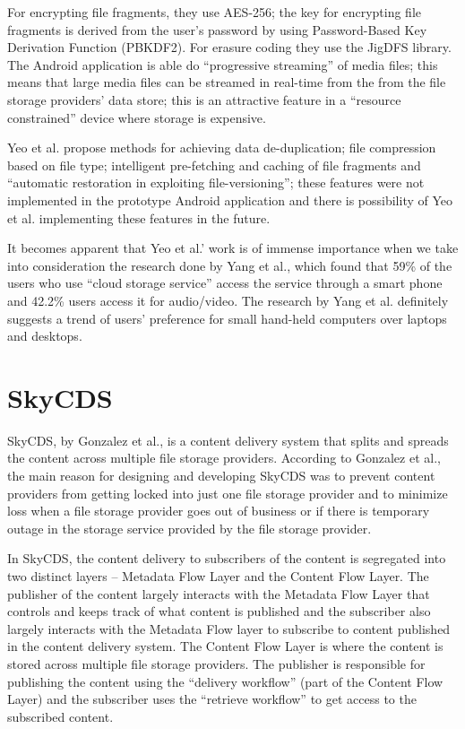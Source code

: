 For encrypting file fragments, they use AES-256; the key for
encrypting file fragments is derived from the user's password by using
Password-Based Key Derivation Function (PBKDF2)\cite{kaliski}. For
erasure coding they use the JigDFS library\cite{jigdfs}. The Android
application is able do ``progressive streaming'' of media files; this
means that large media files can be streamed in real-time from the
from the file storage providers' data store; this is an attractive
feature in a ``resource constrained'' device where storage is
expensive.

Yeo et al. propose methods for achieving data de-duplication; file
compression based on file type; intelligent pre-fetching
and caching of file fragments and ``automatic restoration in
exploiting file-versioning''; these features were not implemented in
the prototype Android application and there is possibility of Yeo et
al. implementing these features in the future.

It becomes apparent that Yeo et al.' work is of immense importance when
we take into consideration the research done by Yang et al., which
found that 59\% of the users who use ``cloud storage service'' access
the service through a smart phone and 42.2\% users access it for
audio/video\cite{yang}. The research by Yang et al. definitely
suggests a trend of users' preference for small hand-held computers
over laptops and desktops.

\section{SkyCDS}\label{2-skycds-sec}

SkyCDS, by Gonzalez et al., is a content delivery system that splits
and spreads the content across multiple file storage
providers\cite{skycds}. According to Gonzalez et al., the main reason
for designing and developing SkyCDS was to prevent content providers
from getting locked into just one file storage provider and to
minimize loss when a file storage provider goes out of business or if
there is temporary outage in the storage service provided by the file
storage provider.

In SkyCDS, the content delivery to subscribers of the content is
segregated into two distinct layers -- Metadata Flow Layer and the
Content Flow Layer. The publisher of the content largely interacts
with the Metadata Flow Layer that controls and keeps track of what
content is published and the subscriber also largely interacts with
the Metadata Flow layer to subscribe to content published in the
content delivery system. The Content Flow Layer is where the content
is stored across multiple file storage providers. The publisher is
responsible for publishing the content using the ``delivery workflow''
(part of the Content Flow Layer) and the subscriber uses the
``retrieve workflow'' to get access to the subscribed content.

